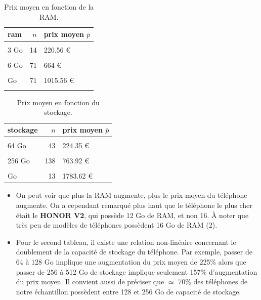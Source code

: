 \documentclass[
  12pt,
]{report}
\begin{document}
\begin{table}[!h]
\centering
\caption{\label{tab:kable_1}Prix moyen en fonction de la RAM.}
\centering
\begin{tabular}[t]{lrl}
\toprule
\textbf{ram} & \textbf{$n$} & \textbf{prix moyen $\bar p$}\\
\midrule
\cellcolor{gray!10}{2 Go} & \cellcolor{gray!10}{14} & \cellcolor{gray!10}{95.86 €}\\
3 Go & 14 & 220.56 €\\
\cellcolor{gray!10}{4 Go} & \cellcolor{gray!10}{105} & \cellcolor{gray!10}{402.31 €}\\
6 Go & 71 & 664 €\\
\cellcolor{gray!10}{8 Go} & \cellcolor{gray!10}{155} & \cellcolor{gray!10}{758.59 €}\\
\addlinespace
12 Go & 71 & 1015.56 €\\
\cellcolor{gray!10}{16 Go} & \cellcolor{gray!10}{2} & \cellcolor{gray!10}{1499 €}\\
\bottomrule
\end{tabular}
\end{table}

\begin{table}[!h]
\centering
\caption{\label{tab:kable_2}Prix moyen en fonction du stockage.}
\centering
\begin{tabular}[t]{lrl}
\toprule
\textbf{stockage} & \textbf{$n$} & \textbf{prix moyen $\bar p$}\\
\midrule
\cellcolor{gray!10}{32 Go} & \cellcolor{gray!10}{16} & \cellcolor{gray!10}{100.09 €}\\
64 Go & 43 & 224.35 €\\
\cellcolor{gray!10}{128 Go} & \cellcolor{gray!10}{173} & \cellcolor{gray!10}{507.96 €}\\
256 Go & 138 & 763.92 €\\
\cellcolor{gray!10}{512 Go} & \cellcolor{gray!10}{49} & \cellcolor{gray!10}{1199.34 €}\\
\addlinespace
1000 Go & 13 & 1783.62 €\\
\bottomrule
\end{tabular}
\end{table}

\begin{itemize}
\item
  On peut voir que plus la RAM augmente, plus le prix moyen du téléphone
  augmente. On a cependant remarqué plus haut que le téléphone le plus
  cher était le \textbf{HONOR V2}, qui possède 12 Go de RAM, et non 16.
  À noter que très peu de modèles de téléphones possèdent 16 Go de RAM
  (2).
\item
  Pour le second tableau, il existe une relation non-linéaire concernant
  le doublement de la capacité de stockage du téléphone. Par exemple,
  passer de 64 à 128 Go implique une augmentation du prix moyen de 225\%
  alors que passer de 256 à 512 Go de stockage implique seulement 157\%
  d'augmentation du prix moyen. Il convient aussi de préciser que
  \(\simeq\) 70\% des téléphones de notre échantillon possèdent entre
  128 et 256 Go de capacité de stockage.
\end{itemize}
\end{document}
